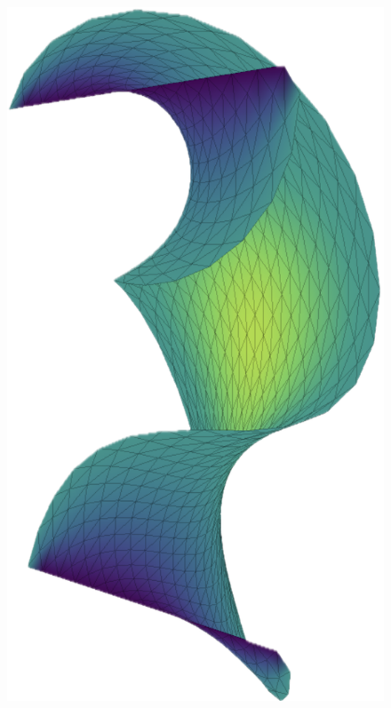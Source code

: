 \begin{figure}[!h]
    \includegraphics[width=0.8\columnwidth]{../images/helix_solution.png}%
    \caption{}
    \label{fig:helix}
\end{figure}

